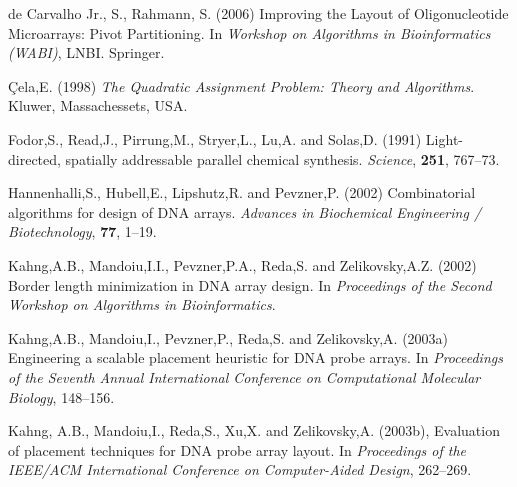 \documentclass[english]{lni}
\newcommand{\ignore}[1]{}
\begin{document}
\begin{thebibliography}{9}

\ignore{
\bibitem{BINDER05} Binder,H. and Preibisch,S. (2005)
Specific and nonspecific hybridization of oligonucleotide probes on microarrays.
{\it Biophysical Journal}, {\bf 89}, 337--352.
}

 de Carvalho Jr., S., Rahmann, S. (2006)
Improving the Layout of Oligonucleotide Microarrays: Pivot Partitioning.
In {\it Workshop on Algorithms in Bioinformatics (WABI)}, LNBI. Springer.

 \c{C}ela,E. (1998) {\it The Quadratic
Assignment Problem: Theory and Algorithms}. Kluwer, Massachessets, USA.
\ignore{
\bibitem{CHASE76} Chase,P.J. (1976) Subsequence numbers and
logarithmic concavity. {\it Discrete Mathematics} {\bf 16}, 123--140.
\bibitem{FELDMAN93} Feldman,W. and Pevzner,P. (1994)
Gray code masks for sequencing by hibridization. {\it Genomics}, {\bf 23},
233--235.
\bibitem{FEO95} Feo,T.A. and Resende,M.G.C. (1995) Greedy
randomized adaptive search procedures. {\it Journal of Global Optimization},
{\bf 6}, 109--133.
}

 Fodor,S., Read,J., Pirrung,M.,
Stryer,L., Lu,A. and Solas,D. (1991) Light-directed, spatially addressable
parallel chemical synthesis. {\it Science}, {\bf 251}, 767--73.

 Hannenhalli,S.,
Hubell,E., Lipshutz,R. and Pevzner,P. (2002) Combinatorial algorithms for design
of DNA arrays. {\it Advances in Biochemical Engineering / Biotechnology},
{\bf 77}, 1--19.

 Kahng,A.B., Mandoiu,I.I.,
Pevzner,P.A., Reda,S. and Zelikovsky,A.Z. (2002) Border length minimization in
DNA array design. In {\it Proceedings of the Second Workshop on Algorithms in
Bioinformatics}.

 Kahng,A.B., Mandoiu,I.,
Pevzner,P., Reda,S. and Zelikovsky,A. (2003a) Engineering a scalable placement
heuristic for DNA probe arrays. In {\it Proceedings of the Seventh Annual
International Conference on Computational Molecular Biology}, 148--156.

 Kahng, A.B., Mandoiu,I., Reda,S.,
Xu,X. and Zelikovsky,A. (2003b), Evaluation of placement techniques for DNA
probe array layout. In {\it Proceedings of the IEEE/ACM International Conference
on Computer-Aided Design}, 262--269.


\end{thebibliography}
\end{document}
